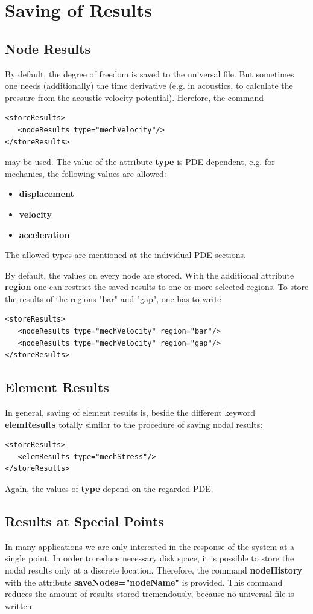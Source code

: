 \chapter{Saving of Results} 

\section{Node Results}
By default, the degree of freedom is saved to the universal file. But
sometimes one needs (additionally) the time derivative (e.g. in
acoustics, to calculate the pressure from the acoustic velocity
potential). Herefore, the command

\begin{verbatim}
<storeResults>
   <nodeResults type="mechVelocity"/>
</storeResults>
\end{verbatim}

may be used. The value of the attribute {\bf type} is PDE dependent,
e.g. for mechanics, the following values are allowed:
\begin{itemize}
\item {\bf displacement}
\item {\bf velocity}    
\item {\bf acceleration}
\end{itemize}
The allowed types are mentioned at the individual PDE sections.

By default, the values on every node are stored. With the additional
attribute {\bf region} one can restrict the saved results to one or
more selected regions.
To store the results of the regions "bar" and "gap", one has to write
\begin{verbatim}
<storeResults>
   <nodeResults type="mechVelocity" region="bar"/>
   <nodeResults type="mechVelocity" region="gap"/>
</storeResults>
\end{verbatim}


\section{Element Results}
In general, saving of element results is, beside the different keyword
{\bf elemResults} totally similar to the procedure of saving nodal
results:
\begin{verbatim}
<storeResults>
   <elemResults type="mechStress"/>
</storeResults>
\end{verbatim}
Again, the values of {\bf type} depend on the regarded PDE. 


\section{Results at Special Points} 
In many applications we are only interested in the response of the
system at a single point. In order to reduce necessary disk space,
it is possible to store the nodal results only at a discrete
location. Therefore, the command {\bf nodeHistory} with the
attribute {\bf saveNodes="nodeName"} is provided. This command
reduces the amount of results stored tremendously, because no
universal-file is written.

